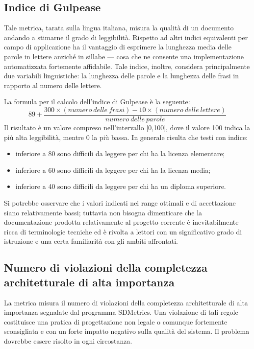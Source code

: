 \subsection{Indice di Gulpease}
Tale metrica, tarata sulla lingua italiana, misura la qualità di un documento andando a stimarne il grado di leggibilità. Rispetto ad altri indici equivalenti per campo di applicazione ha il vantaggio di esprimere la lunghezza media delle parole in lettere anziché in sillabe --- cosa che ne consente una implementazione automatizzata fortemente affidabile. Tale indice, inoltre, considera principalmente due variabili linguistiche: la lunghezza delle parole e la lunghezza delle frasi in rapporto al numero delle lettere.

La formula per il calcolo dell'indice di Gulpease è la seguente:
\begin{equation}
	89+\frac{300\times(numero~delle~frasi)-10\times(numero~delle~lettere)}{numero~delle~parole}
\end{equation}
Il risultato è un valore compreso nell'intervallo [0,100], dove il valore 100 indica la più alta leggibilità, mentre 0 la più bassa. In generale risulta che testi con indice:
\begin{itemize}
	\item inferiore a 80 sono difficili da leggere per chi ha la licenza elementare;
	\item inferiore a 60 sono difficili da leggere per chi ha la licenza media;
	\item inferiore a 40 sono difficili da leggere per chi ha un diploma superiore.	
\end{itemize}
Si potrebbe osservare che i valori indicati nei range ottimali e di accettazione siano relativamente bassi; tuttavia non bisogna dimenticare che la documentazione prodotta relativamente al progetto corrente è inevitabilmente ricca di terminologie tecniche ed è rivolta a lettori con un significativo grado di istruzione e una certa familiarità con gli ambiti affrontati.



\subsection{Numero di violazioni della completezza architetturale di alta importanza}
La metrica misura il numero di violazioni della completezza architetturale di alta importanza segnalate dal programma SDMetrics. Una violazione di tali regole costituisce una pratica di progettazione non legale o comunque fortemente sconsigliata e con un forte impatto negativo sulla qualità del sistema. Il problema dovrebbe essere risolto in ogni circostanza.



